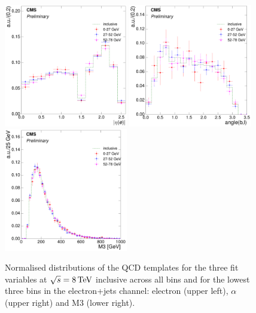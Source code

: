\begin{figure}[hbtp]
    \centering
     \includegraphics[width=0.48\textwidth]{Chapters/04_Analysis/04b_XSections/images/8TeV/fit_variables/electron/WPT/electron_absolute_eta/qcd/WPT_electron_absolute_eta_0orMoreBtag_QCD_template_comparison.pdf}\hfill
     \includegraphics[width=0.48\textwidth]{Chapters/04_Analysis/04b_XSections/images/8TeV/fit_variables/electron/WPT/angle_bl/qcd/WPT_angle_bl_1orMoreBtag_QCD_template_comparison.pdf}\\
     \includegraphics[width=0.48\textwidth]{Chapters/04_Analysis/04b_XSections/images/8TeV/fit_variables/electron/WPT/M3/qcd/WPT_M3_0orMoreBtag_QCD_template_comparison.pdf}\\
	 \caption{Normalised distributions of the QCD templates for the three fit variables at $\sqrt{s}=8\,\text{Te\hspace{-.08em}V}$
	 inclusive across all \wpt bins and for the lowest three \wpt bins in the electron+jets channel: electron
	 \abseta (upper left), $\alpha$ (upper right) and M3 (lower right).}
     \label{fig:WPT_fit_variable_qcd_comparisons_electron_8TeV}
\end{figure}

